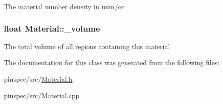 The material number density in num/cc \hypertarget{classMaterial_a78d416095f5ae1235cbe6a39526deca6}{
\subsubsection[{\-\_\-volume}]{\setlength{\rightskip}{0pt plus 5cm}float Material\-::\-\_\-volume\hspace{0.3cm}{\ttfamily [private]}}}\label{classMaterial_a78d416095f5ae1235cbe6a39526deca6}
The total volume of all regions containing this material 

The documentation for this class was generated from the following files\-:\begin{DoxyCompactItemize}
\item 
pinspec/src/\hyperlink{Material_8h}{Material.\-h}\item 
pinspec/src/Material.\-cpp\end{DoxyCompactItemize}

